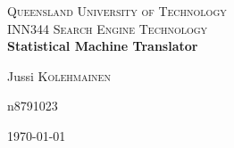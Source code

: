 \begin{titlepage}
\begin{center}



\textsc{ Queensland University of Technology}\\[0.5cm]

\textsc{\Large INN344 Search Engine Technology}\\[3.5cm]


{ \huge \bfseries Statistical Machine Translator \\[0.4cm] }

\begin{minipage}{0.4\textwidth}
\begin{flushleft} \large
Jussi \textsc{Kolehmainen}
\end{flushleft}
\end{minipage}
\begin{minipage}{0.4\textwidth}
\begin{flushright} \large
n8791023
\end{flushright}

\end{minipage}

\vfill

{\large \today}

\end{center}
\end{titlepage}